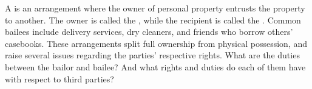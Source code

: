 A  is an arrangement where the owner of personal property
entrusts the property to another. The owner is called the , while
the recipient is called the . Common bailees include delivery
services, dry cleaners, and friends who borrow others' casebooks. These
arrangements split full ownership from physical possession, and raise several
issues regarding the parties' respective rights. What are the duties between the
bailor and bailee? And what rights and duties do each of them have with respect
to third parties?

